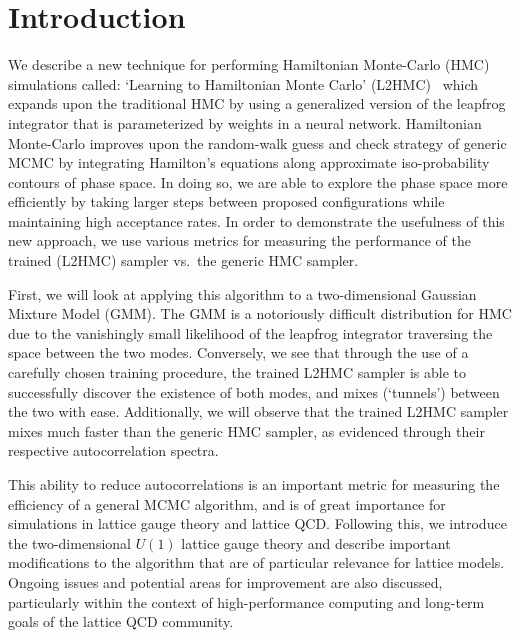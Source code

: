 \section{Introduction}%
\label{sec:l2hmc_intro}
We describe a new technique for performing Hamiltonian Monte-Carlo
(HMC) simulations called: `Learning to Hamiltonian Monte Carlo'
(L2HMC)~\cite{2017arXiv171109268L} which expands upon the traditional HMC by
using a generalized version of the leapfrog integrator that is parameterized by
weights in a neural network.
%
Hamiltonian Monte-Carlo improves upon the random-walk guess and check strategy
of generic MCMC by integrating Hamilton's equations along approximate
iso-probability contours of phase space.
%
In doing so, we are able to explore
the phase space more efficiently by taking larger steps between proposed
configurations while maintaining high acceptance rates.
%
In order to demonstrate the usefulness of this new approach, we use various
metrics for measuring the performance of the trained (L2HMC) sampler vs.\ the
generic HMC sampler.

First, we will look at applying this algorithm to a two-dimensional Gaussian
Mixture Model (GMM).
%
The GMM is a notoriously difficult distribution for HMC due to the vanishingly
small likelihood of the leapfrog integrator traversing the space between the
two modes.
%
Conversely, we see that through the use of a carefully chosen training
procedure, the trained L2HMC sampler is able to successfully discover the
existence of both modes, and mixes (`tunnels') between the two with ease. 
%
Additionally, we will observe that the trained L2HMC sampler mixes much faster
than the generic HMC sampler, as evidenced through their respective
autocorrelation spectra.

This ability to reduce autocorrelations is an important metric for measuring
the efficiency of a general MCMC algorithm, and is of great importance for
simulations in lattice gauge theory and lattice QCD.\@
%
Following this, we introduce the two-dimensional $U(1)$ lattice gauge theory
and describe important modifications to the algorithm that are of particular
relevance for lattice models.
%
Ongoing issues and potential areas for improvement are also discussed,
particularly within the context of high-performance computing and long-term
goals of the lattice QCD community.
